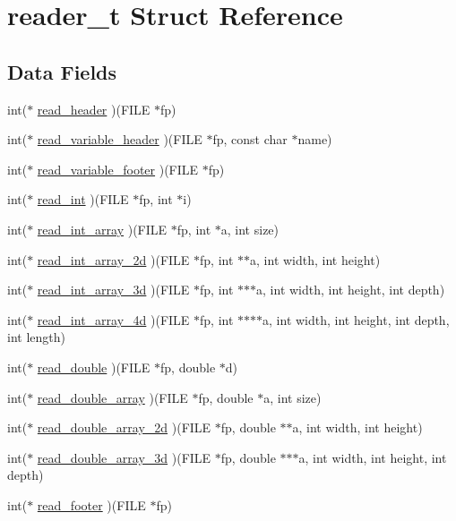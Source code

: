 \hypertarget{structreader__t}{}\section{reader\+\_\+t Struct Reference}
\label{structreader__t}
\subsection*{Data Fields}
\begin{DoxyCompactItemize}
\item 
int($\ast$ \hyperlink{structreader__t_a8540a7b02115132e1d63ef34b88bfca5}{read\+\_\+header} )(F\+I\+LE $\ast$fp)
\item 
int($\ast$ \hyperlink{structreader__t_a1a15124a6e198c9f8a460f503071d2a6}{read\+\_\+variable\+\_\+header} )(F\+I\+LE $\ast$fp, const char $\ast$name)
\item 
int($\ast$ \hyperlink{structreader__t_a1c19dbd8f200b8f8d519e1b21861e0ef}{read\+\_\+variable\+\_\+footer} )(F\+I\+LE $\ast$fp)
\item 
int($\ast$ \hyperlink{structreader__t_a819d0f0a0d588e8c9ce9e09d83f48c3a}{read\+\_\+int} )(F\+I\+LE $\ast$fp, int $\ast$i)
\item 
int($\ast$ \hyperlink{structreader__t_a760b7eaa6a0ee7b9f58747764e382112}{read\+\_\+int\+\_\+array} )(F\+I\+LE $\ast$fp, int $\ast$a, int size)
\item 
int($\ast$ \hyperlink{structreader__t_a1aa8bab71fe8c1026d7130e153b66052}{read\+\_\+int\+\_\+array\+\_\+2d} )(F\+I\+LE $\ast$fp, int $\ast$$\ast$a, int width, int height)
\item 
int($\ast$ \hyperlink{structreader__t_a2e8bb1ae1cdf7fa4324cefda05735f1f}{read\+\_\+int\+\_\+array\+\_\+3d} )(F\+I\+LE $\ast$fp, int $\ast$$\ast$$\ast$a, int width, int height, int depth)
\item 
int($\ast$ \hyperlink{structreader__t_a6c1249ce040b848da09adf8ced9fc941}{read\+\_\+int\+\_\+array\+\_\+4d} )(F\+I\+LE $\ast$fp, int $\ast$$\ast$$\ast$$\ast$a, int width, int height, int depth, int length)
\item 
int($\ast$ \hyperlink{structreader__t_ad81ebd5caa6d7f25f33bc6dddf68bc0f}{read\+\_\+double} )(F\+I\+LE $\ast$fp, double $\ast$d)
\item 
int($\ast$ \hyperlink{structreader__t_a492ae992b1faa462dc7b85972d53a770}{read\+\_\+double\+\_\+array} )(F\+I\+LE $\ast$fp, double $\ast$a, int size)
\item 
int($\ast$ \hyperlink{structreader__t_a4b6b3083612b1e7e4a49bd2d468b8f1d}{read\+\_\+double\+\_\+array\+\_\+2d} )(F\+I\+LE $\ast$fp, double $\ast$$\ast$a, int width, int height)
\item 
int($\ast$ \hyperlink{structreader__t_a9fe018fa8b276a937160e601e3c0b463}{read\+\_\+double\+\_\+array\+\_\+3d} )(F\+I\+LE $\ast$fp, double $\ast$$\ast$$\ast$a, int width, int height, int depth)
\item 
int($\ast$ \hyperlink{structreader__t_a675b82ce610a031d955bac348e95079f}{read\+\_\+footer} )(F\+I\+LE $\ast$fp)
\end{DoxyCompactItemize}


